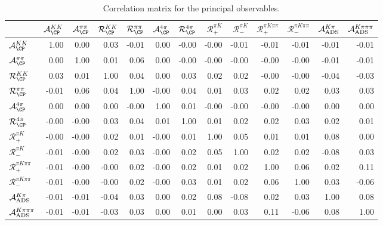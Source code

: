 \begin{table}
\centering
\caption{Correlation matrix for the principal observables.}
\begin{tabular}{l|rrrrrrrrrrrr}
& $\mathcal{A}_{\CP}^{KK}$& $\mathcal{A}_{\CP}^{\pi\pi}$& $\mathcal{R}_{\CP}^{KK}$& $\mathcal{R}_{\CP}^{\pi\pi}$& $\mathcal{A}_{\CP}^{4\pi}$& $\mathcal{R}_{\CP}^{4\pi}$& $\mathcal{R}_+^{\pi K}$& $\mathcal{R}_-^{\pi K}$& $\mathcal{R}_+^{\pi K\pi\pi}$& $\mathcal{R}_-^{\pi K\pi\pi}$& $\mathcal{A}_{\rm ADS}^{K\pi}$& $\mathcal{A}_{\rm ADS}^{K\pi\pi\pi}$ \\
\midrule

$\mathcal{A}_{\CP}^{KK}$& 1.00& 0.00& 0.03& -0.01& 0.00& -0.00& -0.00& -0.01& -0.01& -0.01& -0.01& -0.01 \\

$\mathcal{A}_{\CP}^{\pi\pi}$& 0.00& 1.00& 0.01& 0.06& 0.00& -0.00& -0.00& -0.00& -0.00& -0.00& -0.01& -0.01 \\

$\mathcal{R}_{\CP}^{KK}$& 0.03& 0.01& 1.00& 0.04& 0.00& 0.03& 0.02& 0.02& -0.00& -0.00& -0.04& -0.03 \\

$\mathcal{R}_{\CP}^{\pi\pi}$& -0.01& 0.06& 0.04& 1.00& -0.00& 0.04& 0.01& 0.03& 0.02& 0.02& 0.03& 0.03 \\

$\mathcal{A}_{\CP}^{4\pi}$& 0.00& 0.00& 0.00& -0.00& 1.00& 0.01& -0.00& -0.00& -0.00& -0.00& 0.00& 0.00 \\

$\mathcal{R}_{\CP}^{4\pi}$& -0.00& -0.00& 0.03& 0.04& 0.01& 1.00& 0.01& 0.02& 0.02& 0.03& 0.02& 0.01 \\

$\mathcal{R}_+^{\pi K}$& -0.00& -0.00& 0.02& 0.01& -0.00& 0.01& 1.00& 0.05& 0.01& 0.01& 0.08& 0.00 \\

$\mathcal{R}_-^{\pi K}$& -0.01& -0.00& 0.02& 0.03& -0.00& 0.02& 0.05& 1.00& 0.02& 0.02& -0.08& 0.03 \\

$\mathcal{R}_+^{\pi K\pi\pi}$& -0.01& -0.00& -0.00& 0.02& -0.00& 0.02& 0.01& 0.02& 1.00& 0.06& 0.02& 0.11 \\

$\mathcal{R}_-^{\pi K\pi\pi}$& -0.01& -0.00& -0.00& 0.02& -0.00& 0.03& 0.01& 0.02& 0.06& 1.00& 0.03& -0.06 \\

$\mathcal{A}_{\rm ADS}^{K\pi}$& -0.01& -0.01& -0.04& 0.03& 0.00& 0.02& 0.08& -0.08& 0.02& 0.03& 1.00& 0.08 \\

$\mathcal{A}_{\rm ADS}^{K\pi\pi\pi}$& -0.01& -0.01& -0.03& 0.03& 0.00& 0.01& 0.00& 0.03& 0.11& -0.06& 0.08& 1.00 \\
\end{tabular}
\label{tab:correlation}
\end{table}
